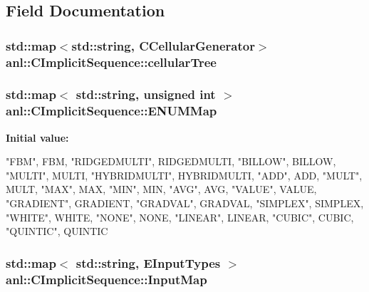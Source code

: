 \subsection{Field Documentation}
\hypertarget{classanl_1_1CImplicitSequence_a3b8f7448c87195a5afe6a19fe8845817}{
\subsubsection[{cellularTree}]{\setlength{\rightskip}{0pt plus 5cm}std::map$<$std::string, {\bf CCellularGenerator}$>$ {\bf anl::CImplicitSequence::cellularTree}}}
\label{classanl_1_1CImplicitSequence_a3b8f7448c87195a5afe6a19fe8845817}
\hypertarget{classanl_1_1CImplicitSequence_add19693d97dcac3984a0efd40fba1b69}{
\subsubsection[{ENUMMap}]{\setlength{\rightskip}{0pt plus 5cm}std::map$<$ std::string, unsigned int $>$ {\bf anl::CImplicitSequence::ENUMMap}}}
\label{classanl_1_1CImplicitSequence_add19693d97dcac3984a0efd40fba1b69}
{\bfseries Initial value:}
\begin{DoxyCode}
 {
        {"FBM", FBM},
        {"RIDGEDMULTI", RIDGEDMULTI},
        {"BILLOW", BILLOW},
        {"MULTI", MULTI},
        {"HYBRIDMULTI", HYBRIDMULTI},
        {"ADD", ADD},
        {"MULT", MULT},
        {"MAX", MAX},
        {"MIN", MIN},
        {"AVG", AVG},
        {"VALUE", VALUE},
        {"GRADIENT", GRADIENT},
        {"GRADVAL", GRADVAL},
        {"SIMPLEX", SIMPLEX},
        {"WHITE", WHITE},
        {"NONE", NONE},
        {"LINEAR", LINEAR},
        {"CUBIC", CUBIC},
        {"QUINTIC", QUINTIC}
    }
\end{DoxyCode}
\hypertarget{classanl_1_1CImplicitSequence_a387855cd1e251196f98a3c683ebfa66f}{
\subsubsection[{InputMap}]{\setlength{\rightskip}{0pt plus 5cm}std::map$<$ std::string, {\bf EInputTypes} $>$ {\bf anl::CImplicitSequence::InputMap}}}
